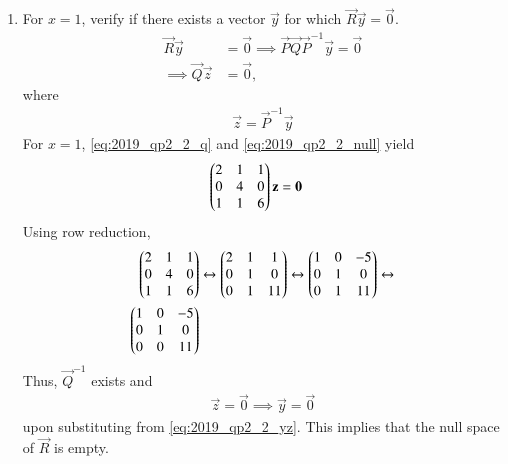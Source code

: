 \begin{enumerate}[label=\arabic*.,ref=\thesubsection.\theenumi]
\item For $x = 1$, verify if  there exists a  vector $\vec{y}$ for which $\vec{R}\vec{y} = \vec{0}$. 
\\
\solution 
\begin{align}
\vec{R}\vec{y} &= \vec{0} \implies \vec{P}\vec{Q}\vec{P}^{-1}\vec{y} = \vec{0}
\nonumber \\
\implies \vec{Q} \vec{z}&= \vec{0},
\label{eq:2019_qp2_2_null}
\end{align}
%
where 
\begin{align}
\label{eq:2019_qp2_2_yz}
\vec{z} = \vec{P}^{-1}\vec{y} 
\end{align}
For $x=1$, \eqref{eq:2019_qp2_2_q} and \eqref{eq:2019_qp2_2_null} yield
\begin{align}
\label{eq:2019_qp2_2_x1}
\begin{pmatrix}2 & 1 & 1 \\ 0 & 4 & 0 \\ 1 & 1 & 6\end{pmatrix}\mathbf{z} &= \mathbf{0} 
\end{align}
Using row reduction,
\begin{align}
\begin{pmatrix}2 & 1 & 1 \\ 0 & 4 & 0 \\ 1 & 1 & 6\end{pmatrix} &\leftrightarrow
\begin{pmatrix}2 & 1 & 1 \\ 0 & 1 & 0 \\ 0 & 1 & 11\end{pmatrix} \leftrightarrow
\begin{pmatrix}1 & 0 & -5 \\ 0 & 1 & 0 \\ 0 & 1 & 11\end{pmatrix} \leftrightarrow
\nonumber \\
\begin{pmatrix}1 & 0 & -5 \\ 0 & 1 & 0 \\ 0 & 0 & 11\end{pmatrix} &
\end{align}
%
Thus, $\vec{Q}^{-1}$ exists and 
\begin{align}
\vec{z} = \vec{0} \implies \vec{y}= \vec{0}
\end{align}
upon substituting from \eqref{eq:2019_qp2_2_yz}.
This implies that the null space of $\vec{R}$ is empty. 
\end{enumerate}

